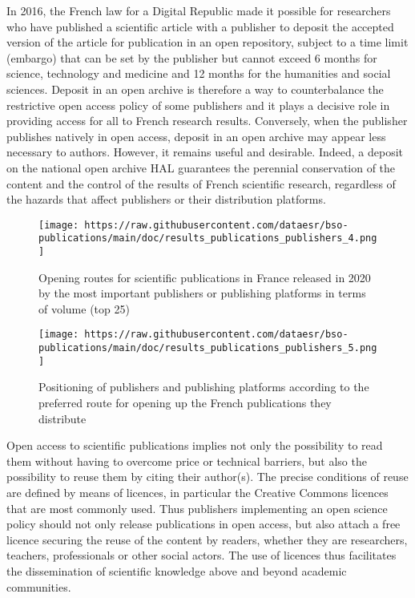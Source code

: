 \documentclass[
]{article}
\begin{document}
In 2016, the French law for a Digital Republic made it possible for
researchers who have published a scientific article with a publisher to
deposit the accepted version of the article for publication in an open
repository, subject to a time limit (embargo) that can be set by the
publisher but cannot exceed 6 months for science, technology and
medicine and 12 months for the humanities and social sciences. Deposit
in an open archive is therefore a way to counterbalance the restrictive
open access policy of some publishers and it plays a decisive role in
providing access for all to French research results. Conversely, when
the publisher publishes natively in open access, deposit in an open
archive may appear less necessary to authors. However, it remains useful
and desirable. Indeed, a deposit on the national open archive HAL
guarantees the perennial conservation of the content and the control of
the results of French scientific research, regardless of the hazards
that affect publishers or their distribution platforms.

\begin{figure}
\centering
\texttt{[image: https://raw.githubusercontent.com/dataesr/bso-publications/main/doc/results\_publications\_publishers\_4.png]}
\caption{Opening routes for scientific publications in France released
in 2020 by the most important publishers or publishing platforms in
terms of volume (top 25)}
\end{figure}

\begin{figure}
\centering
\texttt{[image: https://raw.githubusercontent.com/dataesr/bso-publications/main/doc/results\_publications\_publishers\_5.png]}
\caption{Positioning of publishers and publishing platforms according to
the preferred route for opening up the French publications they
distribute}
\end{figure}

Open access to scientific publications implies not only the possibility
to read them without having to overcome price or technical barriers, but
also the possibility to reuse them by citing their author(s). The
precise conditions of reuse are defined by means of licences, in
particular the Creative Commons licences that are most commonly used.
Thus publishers implementing an open science policy should not only
release publications in open access, but also attach a free licence
securing the reuse of the content by readers, whether they are
researchers, teachers, professionals or other social actors. The use of
licences thus facilitates the dissemination of scientific knowledge
above and beyond academic communities.
\end{document}
